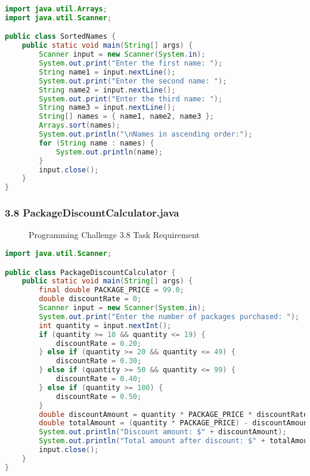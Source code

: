 \documentclass{article}
\begin{document}
\begin{lstlisting}[language=Java, caption=SortedNames.java]
import java.util.Arrays;
import java.util.Scanner;

public class SortedNames {
    public static void main(String[] args) {
        Scanner input = new Scanner(System.in);
        System.out.print("Enter the first name: ");
        String name1 = input.nextLine();
        System.out.print("Enter the second name: ");
        String name2 = input.nextLine();
        System.out.print("Enter the third name: ");
        String name3 = input.nextLine();
        String[] names = { name1, name2, name3 };
        Arrays.sort(names);
        System.out.println("\nNames in ascending order:");
        for (String name : names) {
            System.out.println(name);
        }
        input.close();
    }
}
\end{lstlisting}

\subsubsection*{3.8 PackageDiscountCalculator.java}

\begin{figure}[h]
    \centering
    \caption{Programming Challenge 3.8 Task Requirement}
\end{figure}

\begin{lstlisting}[language=Java, caption=PackageDiscountCalculator.java]
import java.util.Scanner;

public class PackageDiscountCalculator {
    public static void main(String[] args) {
        final double PACKAGE_PRICE = 99.0;
        double discountRate = 0;
        Scanner input = new Scanner(System.in);
        System.out.print("Enter the number of packages purchased: ");
        int quantity = input.nextInt();
        if (quantity >= 10 && quantity <= 19) {
            discountRate = 0.20;
        } else if (quantity >= 20 && quantity <= 49) {
            discountRate = 0.30;
        } else if (quantity >= 50 && quantity <= 99) {
            discountRate = 0.40;
        } else if (quantity >= 100) {
            discountRate = 0.50;
        }
        double discountAmount = quantity * PACKAGE_PRICE * discountRate;
        double totalAmount = (quantity * PACKAGE_PRICE) - discountAmount;
        System.out.println("Discount amount: $" + discountAmount);
        System.out.println("Total amount after discount: $" + totalAmount);
        input.close();
    }
}
\end{lstlisting}
\end{document}
